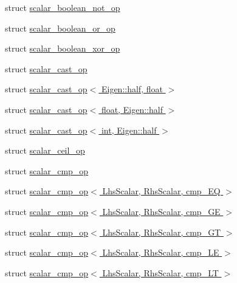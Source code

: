 \begin{DoxyCompactItemize}
\item 
struct \hyperlink{struct_eigen_1_1internal_1_1scalar__boolean__not__op}{scalar\+\_\+boolean\+\_\+not\+\_\+op}
\item 
struct \hyperlink{struct_eigen_1_1internal_1_1scalar__boolean__or__op}{scalar\+\_\+boolean\+\_\+or\+\_\+op}
\item 
struct \hyperlink{struct_eigen_1_1internal_1_1scalar__boolean__xor__op}{scalar\+\_\+boolean\+\_\+xor\+\_\+op}
\item 
struct \hyperlink{struct_eigen_1_1internal_1_1scalar__cast__op}{scalar\+\_\+cast\+\_\+op}
\item 
struct \hyperlink{struct_eigen_1_1internal_1_1scalar__cast__op_3_01_eigen_1_1half_00_01float_01_4}{scalar\+\_\+cast\+\_\+op$<$ Eigen\+::half, float $>$}
\item 
struct \hyperlink{struct_eigen_1_1internal_1_1scalar__cast__op_3_01float_00_01_eigen_1_1half_01_4}{scalar\+\_\+cast\+\_\+op$<$ float, Eigen\+::half $>$}
\item 
struct \hyperlink{struct_eigen_1_1internal_1_1scalar__cast__op_3_01int_00_01_eigen_1_1half_01_4}{scalar\+\_\+cast\+\_\+op$<$ int, Eigen\+::half $>$}
\item 
struct \hyperlink{struct_eigen_1_1internal_1_1scalar__ceil__op}{scalar\+\_\+ceil\+\_\+op}
\item 
struct \hyperlink{struct_eigen_1_1internal_1_1scalar__cmp__op}{scalar\+\_\+cmp\+\_\+op}
\item 
struct \hyperlink{struct_eigen_1_1internal_1_1scalar__cmp__op_3_01_lhs_scalar_00_01_rhs_scalar_00_01cmp___e_q_01_4}{scalar\+\_\+cmp\+\_\+op$<$ Lhs\+Scalar, Rhs\+Scalar, cmp\+\_\+\+E\+Q $>$}
\item 
struct \hyperlink{struct_eigen_1_1internal_1_1scalar__cmp__op_3_01_lhs_scalar_00_01_rhs_scalar_00_01cmp___g_e_01_4}{scalar\+\_\+cmp\+\_\+op$<$ Lhs\+Scalar, Rhs\+Scalar, cmp\+\_\+\+G\+E $>$}
\item 
struct \hyperlink{struct_eigen_1_1internal_1_1scalar__cmp__op_3_01_lhs_scalar_00_01_rhs_scalar_00_01cmp___g_t_01_4}{scalar\+\_\+cmp\+\_\+op$<$ Lhs\+Scalar, Rhs\+Scalar, cmp\+\_\+\+G\+T $>$}
\item 
struct \hyperlink{struct_eigen_1_1internal_1_1scalar__cmp__op_3_01_lhs_scalar_00_01_rhs_scalar_00_01cmp___l_e_01_4}{scalar\+\_\+cmp\+\_\+op$<$ Lhs\+Scalar, Rhs\+Scalar, cmp\+\_\+\+L\+E $>$}
\item 
struct \hyperlink{struct_eigen_1_1internal_1_1scalar__cmp__op_3_01_lhs_scalar_00_01_rhs_scalar_00_01cmp___l_t_01_4}{scalar\+\_\+cmp\+\_\+op$<$ Lhs\+Scalar, Rhs\+Scalar, cmp\+\_\+\+L\+T $>$}

\end{DoxyCompactItemize}
